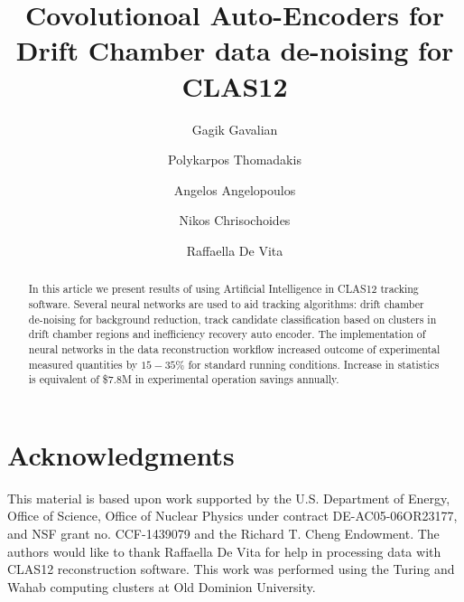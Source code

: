 \documentclass[preprint,12pt]{elsarticle}
\title{Covolutionoal Auto-Encoders for Drift Chamber data de-noising for CLAS12}
\author[1]{Gagik Gavalian}
\author[2]{Polykarpos Thomadakis}
\author[2]{Angelos Angelopoulos}
\author[2]{Nikos Chrisochoides}
\author[3]{Raffaella De Vita}
\begin{document}
\begin{abstract}

In this article we present results of using Artificial Intelligence in CLAS12 tracking software. Several neural networks are used to aid tracking algorithms: drift chamber de-noising for background reduction, track candidate classification based on clusters in drift chamber regions and inefficiency recovery auto encoder. The implementation of neural networks in the data reconstruction workflow increased outcome of experimental measured quantities by $15-35\%$ for standard running conditions. Increase in statistics is equivalent of \$$7.8$M in experimental operation savings annually.

\end{abstract}
\maketitle













%



\newpage

\section{Acknowledgments}

This material is based upon work supported by the U.S. Department of Energy, Office of Science,
Office of Nuclear Physics under contract DE-AC05-06OR23177, and NSF grant no. CCF-1439079 and
the Richard T. Cheng Endowment. The authors would like to thank Raffaella De Vita for help in
processing data with CLAS12 reconstruction software. This work was performed using the Turing
and Wahab computing clusters at Old Dominion University.
 
\newpage


\end{document}
